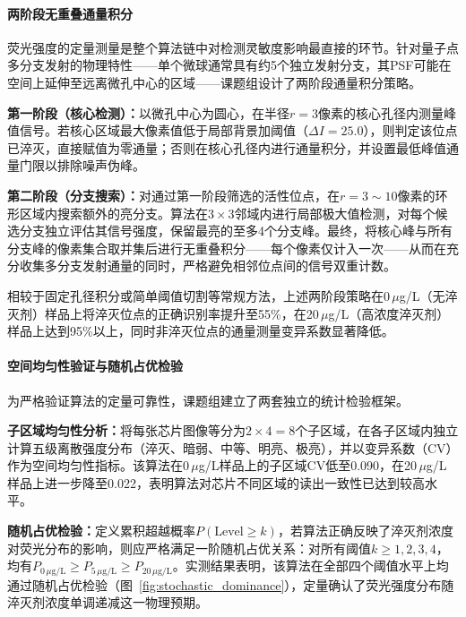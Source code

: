 \documentclass[12pt,a4paper]{article}
\begin{document}
\paragraph{两阶段无重叠通量积分}\mbox{}

荧光强度的定量测量是整个算法链中对检测灵敏度影响最直接的环节。针对量子点多分支发射的物理特性——单个微球通常具有约5个独立发射分支，其PSF可能在空间上延伸至远离微孔中心的区域——课题组设计了两阶段通量积分策略。

\textbf{第一阶段（核心检测）：}以微孔中心为圆心，在半径$r=3$像素的核心孔径内测量峰值信号。若核心区域最大像素值低于局部背景加阈值（$\Delta I = 25.0$），则判定该位点已淬灭，直接赋值为零通量；否则在核心孔径内进行通量积分，并设置最低峰值通量门限以排除噪声伪峰。

\textbf{第二阶段（分支搜索）：}对通过第一阶段筛选的活性位点，在$r = 3 \sim 10$像素的环形区域内搜索额外的亮分支。算法在$3 \times 3$邻域内进行局部极大值检测，对每个候选分支独立评估其信号强度，保留最亮的至多4个分支峰。最终，将核心峰与所有分支峰的像素集合取并集后进行无重叠积分——每个像素仅计入一次——从而在充分收集多分支发射通量的同时，严格避免相邻位点间的信号双重计数。

相较于固定孔径积分或简单阈值切割等常规方法，上述两阶段策略在0\,$\mu$g/L（无淬灭剂）样品上将淬灭位点的正确识别率提升至55\%，在20\,$\mu$g/L（高浓度淬灭剂）样品上达到95\%以上，同时非淬灭位点的通量测量变异系数显著降低。

\paragraph{空间均匀性验证与随机占优检验}\mbox{}

为严格验证算法的定量可靠性，课题组建立了两套独立的统计检验框架。

\textbf{子区域均匀性分析：}将每张芯片图像等分为$2 \times 4 = 8$个子区域，在各子区域内独立计算五级离散强度分布（淬灭、暗弱、中等、明亮、极亮），并以变异系数（CV）作为空间均匀性指标。该算法在0\,$\mu$g/L样品上的子区域CV低至0.090，在20\,$\mu$g/L样品上进一步降至0.022，表明算法对芯片不同区域的读出一致性已达到较高水平。

\textbf{随机占优检验：}定义累积超越概率$P(\text{Level} \geq k)$，若算法正确反映了淬灭剂浓度对荧光分布的影响，则应严格满足一阶随机占优关系：对所有阈值$k \geq 1, 2, 3, 4$，均有$P_{0\,\mu\text{g/L}} \geq P_{5\,\mu\text{g/L}} \geq P_{20\,\mu\text{g/L}}$。实测结果表明，该算法在全部四个阈值水平上均通过随机占优检验（图~\ref{fig:stochastic_dominance}），定量确认了荧光强度分布随淬灭剂浓度单调递减这一物理预期。
\end{document}
